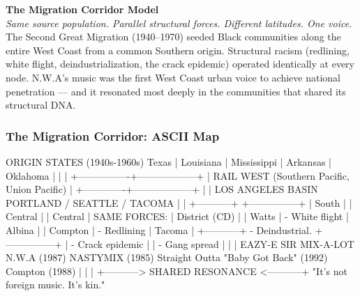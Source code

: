 \documentclass[11pt,letterpaper]{article}
\begin{document}
\begin{center}
\colorbox{lightprimary}{\parbox{0.85\textwidth}{
\centering\vspace{4pt}
{\sffamily\bfseries\textcolor{primary}{The Migration Corridor Model}}\\[4pt]
\textit{Same source population. Parallel structural forces. Different latitudes. One voice.}\\[4pt]
The Second Great Migration (1940--1970) seeded Black communities along the entire West Coast from a common Southern origin. Structural racism (redlining, white flight, deindustrialization, the crack epidemic) operated identically at every node. N.W.A's music was the first West Coast urban voice to achieve national penetration --- and it resonated most deeply in the communities that shared its structural DNA.
\vspace{4pt}}}
\end{center}

\subsubsection{The Migration Corridor: ASCII Map}

\begin{asciibox}
    ORIGIN STATES (1940s-1960s)
    Texas | Louisiana | Mississippi | Arkansas | Oklahoma
         |                |                  |
         +----------------+------------------+
                          |
                    RAIL WEST (Southern Pacific, Union Pacific)
                          |
            +-------------+------------------+
            |                                |
     LOS ANGELES BASIN                  PORTLAND / SEATTLE / TACOMA
            |                                |
     +-----------+                   +---------------+
     | South     |                   | Central       |
     | Central   |  SAME FORCES:     | District (CD) |
     | Watts     |  - White flight   | Albina        |
     | Compton   |  - Redlining      | Tacoma        |
     +-----------+  - Deindustrial.  +---------------+
            |       - Crack epidemic          |
            |       - Gang spread             |
            |                                 |
         EAZY-E                          SIR MIX-A-LOT
       N.W.A (1987)                   NASTYMIX (1985)
    Straight Outta                  "Baby Got Back" (1992)
       Compton (1988)                    |
            |                            |
            +-----------> SHARED RESONANCE <-----------+
                      "It's not foreign music. It's kin."
\end{asciibox}
\end{document}
